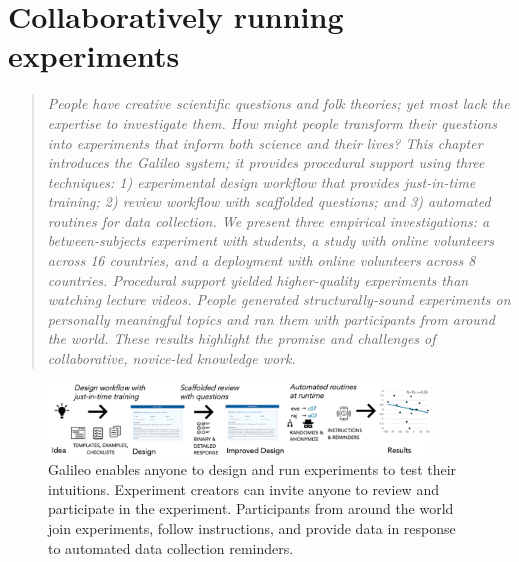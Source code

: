 \chapter{Collaboratively running experiments}
\begin{quote}
\emph{People have creative scientific questions and folk theories;
yet most lack the expertise to investigate them. How might
people transform their questions into experiments that
inform both science and their lives? This chapter introduces
the Galileo system; it provides procedural support using
three techniques: 1) experimental design workflow that
provides just-in-time training; 2) review workflow with
scaffolded questions; and 3) automated routines for data
collection. We present three empirical investigations: a
between-subjects experiment with students, a study with
online volunteers across 16 countries, and a deployment
with online volunteers across 8 countries. Procedural
support yielded higher-quality experiments than watching
lecture videos. People generated structurally-sound experiments
on personally meaningful topics and ran them with
participants from around the world. These results highlight
the promise and challenges of collaborative, novice-led
knowledge work.}
\end{quote}

\begin{figure}[h] 
  \centering
  \includegraphics[width=0.9\textwidth]{figures/galileo/galileo-1}
  \caption[Galileo enables anyone to design and run experiments to test their intuitions]
{Galileo enables anyone to design and run experiments to test their intuitions. Experiment creators can invite anyone to review and participate in the experiment. Participants from around the world join experiments, follow instructions, and provide data in response to automated data collection reminders.}
  \label{fig:galileo-1}
\end{figure}

\vspace{0.25in}

